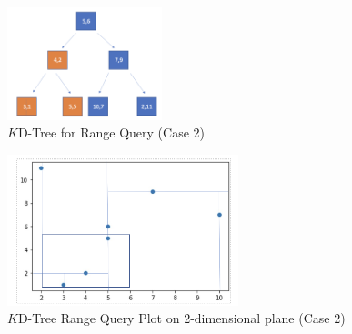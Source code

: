 \begin{figure}[htp]
        \centering
        \includegraphics[width=0.4\textwidth]{graphs/Range_Query_Tree_02.png}
        \caption{$K$D-Tree for Range Query (Case 2)}
        \label{fig:KD-Tree_for_Range_Query_Case2}
\end{figure}


\begin{figure}[htp]
    \centering
    \includegraphics[width=0.6\textwidth]{graphs/Range_Query_plot_02.png}
    \caption{$K$D-Tree Range Query Plot on 2-dimensional plane (Case 2)}
    \label{fig:KD_Tree_Range_Query_Plot_Case2}
\end{figure}

